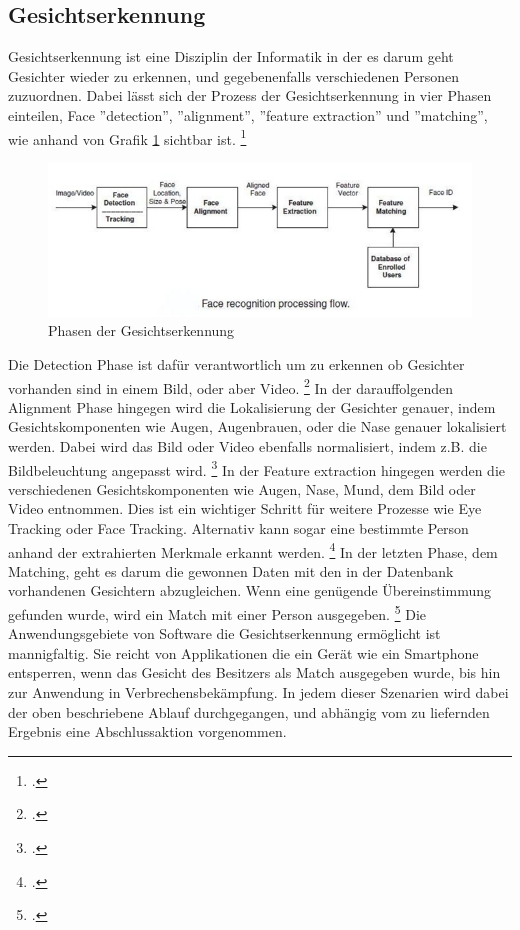 \documentclass[12pt, a4paper]{report}
\newcommand*\setcaptioncitation[1]{\def\captioncitation{\textit{Quelle:}~#1}}
\let\captioncitation\relax
\begin{document}
\subsection{Gesichtserkennung}
Gesichtserkennung ist eine Disziplin der Informatik in der es darum geht Gesichter wieder zu erkennen, und gegebenenfalls verschiedenen Personen zuzuordnen. Dabei lässt sich der Prozess der
Gesichtserkennung in vier Phasen einteilen, Face ''detection'', ''alignment'', ''feature extraction'' und ''matching'', wie anhand von Grafik \ref{fig:Face Recognition} sichtbar ist.
\footcite[Vgl. ][2]{HandbookFaceRec}
\begin{figure}[h]
\includegraphics[width=\linewidth]{Bilder/FaceRecognition.png}
\setcaptioncitation{ https://alitarhini.files.wordpress.com/2010/12/untitled1.png}
\caption{ Phasen der Gesichtserkennung}
\label{fig:Face Recognition}
\end{figure}
Die Detection Phase ist dafür verantwortlich um zu erkennen ob Gesichter vorhanden sind in einem Bild, oder aber Video.
\footcite[Vgl. ][2]{HandbookFaceRec}
In der darauffolgenden Alignment Phase hingegen wird die Lokalisierung der Gesichter genauer, indem Gesichtskomponenten wie Augen, Augenbrauen, oder die Nase genauer lokalisiert werden. Dabei
wird das Bild oder Video ebenfalls normalisiert, indem z.B. die Bildbeleuchtung angepasst wird.
\footcite[Vgl. ][2]{HandbookFaceRec}
In der Feature extraction hingegen werden die verschiedenen Gesichtskomponenten wie Augen, Nase, Mund, dem Bild oder Video entnommen. Dies ist ein wichtiger Schritt für weitere Prozesse wie
Eye Tracking oder Face Tracking. Alternativ kann sogar eine bestimmte Person anhand der extrahierten Merkmale erkannt werden.
\footcite[Vgl. ][Abstract]{IEEE}
In der letzten Phase, dem Matching, geht es darum die gewonnen Daten mit den in der Datenbank vorhandenen Gesichtern abzugleichen. Wenn eine genügende Übereinstimmung gefunden wurde, wird ein
Match mit einer Person ausgegeben.
\footcite[Vgl. ][3]{HandbookFaceRec}
Die Anwendungsgebiete von Software die Gesichtserkennung ermöglicht ist mannigfaltig. Sie reicht von Applikationen die ein Gerät wie ein Smartphone entsperren, wenn das Gesicht des Besitzers als
Match ausgegeben wurde, bis hin zur Anwendung in Verbrechensbekämpfung. In jedem dieser Szenarien wird dabei der oben beschriebene Ablauf durchgegangen, und abhängig vom zu liefernden Ergebnis
eine Abschlussaktion vorgenommen.
\end{document}
